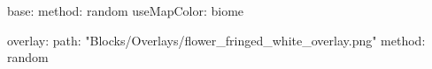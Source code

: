 base:
  method: random
  useMapColor: biome
  
overlay:
  path: "Blocks/Overlays/flower_fringed_white_overlay.png"
  method: random